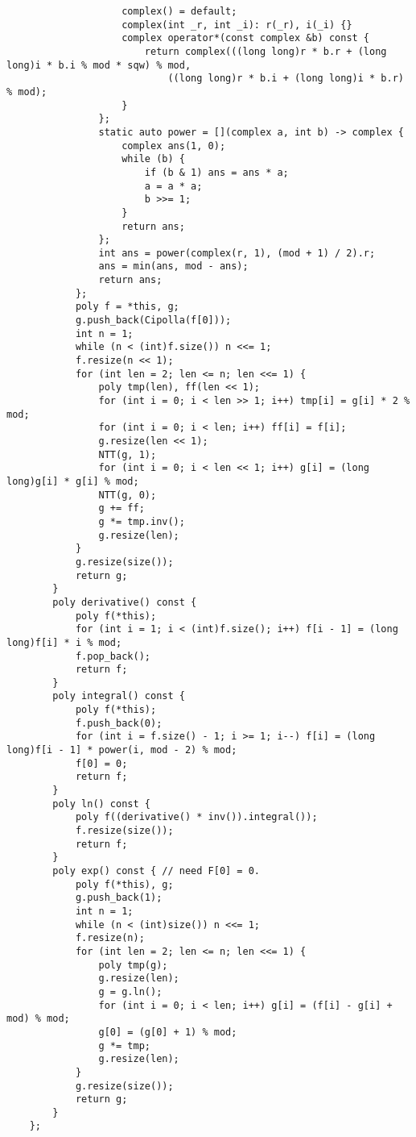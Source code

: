 \begin{verbatim}
                    complex() = default;
                    complex(int _r, int _i): r(_r), i(_i) {}
                    complex operator*(const complex &b) const {
                        return complex(((long long)r * b.r + (long long)i * b.i % mod * sqw) % mod,
                            ((long long)r * b.i + (long long)i * b.r) % mod);
                    }
                };
                static auto power = [](complex a, int b) -> complex {
                    complex ans(1, 0);
                    while (b) {
                        if (b & 1) ans = ans * a;
                        a = a * a;
                        b >>= 1;
                    }
                    return ans;
                };
                int ans = power(complex(r, 1), (mod + 1) / 2).r;
                ans = min(ans, mod - ans);
                return ans;
            };
            poly f = *this, g;
            g.push_back(Cipolla(f[0]));
            int n = 1;
            while (n < (int)f.size()) n <<= 1;
            f.resize(n << 1);
            for (int len = 2; len <= n; len <<= 1) {
                poly tmp(len), ff(len << 1);
                for (int i = 0; i < len >> 1; i++) tmp[i] = g[i] * 2 % mod;
                for (int i = 0; i < len; i++) ff[i] = f[i];
                g.resize(len << 1);
                NTT(g, 1);
                for (int i = 0; i < len << 1; i++) g[i] = (long long)g[i] * g[i] % mod;
                NTT(g, 0);
                g += ff;
                g *= tmp.inv();
                g.resize(len);
            }
            g.resize(size());
            return g;
        }
        poly derivative() const {
            poly f(*this);
            for (int i = 1; i < (int)f.size(); i++) f[i - 1] = (long long)f[i] * i % mod;
            f.pop_back();
            return f;
        }
        poly integral() const {
            poly f(*this);
            f.push_back(0);
            for (int i = f.size() - 1; i >= 1; i--) f[i] = (long long)f[i - 1] * power(i, mod - 2) % mod;
            f[0] = 0;
            return f;
        }
        poly ln() const {
            poly f((derivative() * inv()).integral());
            f.resize(size()); 
            return f;
        }
        poly exp() const { // need F[0] = 0.
            poly f(*this), g;
            g.push_back(1);
            int n = 1;
            while (n < (int)size()) n <<= 1;
            f.resize(n);
            for (int len = 2; len <= n; len <<= 1) {
                poly tmp(g);
                g.resize(len);
                g = g.ln();
                for (int i = 0; i < len; i++) g[i] = (f[i] - g[i] + mod) % mod;
                g[0] = (g[0] + 1) % mod;
                g *= tmp;
                g.resize(len);
            }
            g.resize(size());
            return g;
        }
    };


\end{verbatim}
